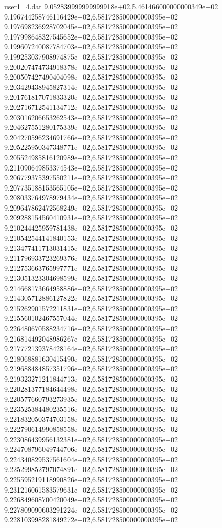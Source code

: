 \begin{filecontents}{user1_4.dat}
9.052839999999999918e+02,5.461466000000000349e+02
9.196744258746116429e+02,6.581728500000000395e+02
9.197698236928702045e+02,6.581728500000000395e+02
9.197998648327545652e+02,6.581728500000000395e+02
9.199607240087784703e+02,6.581728500000000395e+02
9.199253037908974875e+02,6.581728500000000395e+02
9.200207474734918378e+02,6.581728500000000395e+02
9.200507427490404098e+02,6.581728500000000395e+02
9.203429438945827314e+02,6.581728500000000395e+02
9.201761817071833320e+02,6.581728500000000395e+02
9.202716712541134712e+02,6.581728500000000395e+02
9.203016206653262543e+02,6.581728500000000395e+02
9.204627551280175339e+02,6.581728500000000395e+02
9.204270596234691766e+02,6.581728500000000395e+02
9.205225950347348771e+02,6.581728500000000395e+02
9.205524985816120989e+02,6.581728500000000395e+02
9.211090649853374543e+02,6.581728500000000395e+02
9.206779375397550211e+02,6.581728500000000395e+02
9.207735188153565105e+02,6.581728500000000395e+02
9.208033764978979434e+02,6.581728500000000395e+02
9.209647862472568249e+02,6.581728500000000395e+02
9.209288154560410931e+02,6.581728500000000395e+02
9.210244425959781438e+02,6.581728500000000395e+02
9.210542544141840153e+02,6.581728500000000395e+02
9.213477411713031415e+02,6.581728500000000395e+02
9.211796933723269376e+02,6.581728500000000395e+02
9.212753663765997771e+02,6.581728500000000395e+02
9.213051323304698599e+02,6.581728500000000395e+02
9.214668173664958886e+02,6.581728500000000395e+02
9.214305712886127822e+02,6.581728500000000395e+02
9.215262901572211831e+02,6.581728500000000395e+02
9.215560102467557044e+02,6.581728500000000395e+02
9.226480670588234716e+02,6.581728500000000395e+02
9.216814492048986267e+02,6.581728500000000395e+02
9.217772139378428164e+02,6.581728500000000395e+02
9.218068881630415490e+02,6.581728500000000395e+02
9.219688484857351796e+02,6.581728500000000395e+02
9.219323271211844713e+02,6.581728500000000395e+02
9.220281377184644498e+02,6.581728500000000395e+02
9.220577660793273935e+02,6.581728500000000395e+02
9.223525384480235516e+02,6.581728500000000395e+02
9.221832050374703158e+02,6.581728500000000395e+02
9.222790614990858558e+02,6.581728500000000395e+02
9.223086439956132381e+02,6.581728500000000395e+02
9.224708796049744706e+02,6.581728500000000395e+02
9.224340829537561604e+02,6.581728500000000395e+02
9.225299852797074891e+02,6.581728500000000395e+02
9.225595219118990826e+02,6.581728500000000395e+02
9.231216061583579631e+02,6.581728500000000395e+02
9.226849608700420049e+02,6.581728500000000395e+02
9.227809090603291224e+02,6.581728500000000395e+02
9.228103998281849272e+02,6.581728500000000395e+02

\end{filecontents}
